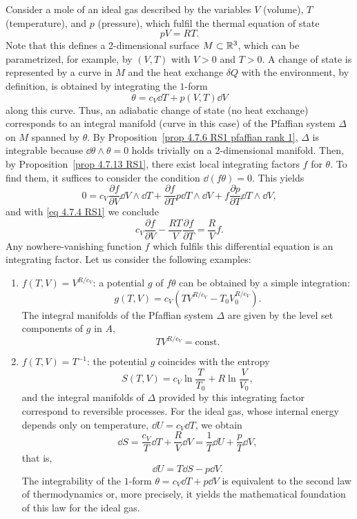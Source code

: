 \begin{example}
    Consider a mole of an ideal gas described by the variables $V$ (volume), $T$ (temperature), and $p$ (pressure), which fulfil the thermal equation of state
    \[pV=RT.\label{eq 4.7.4 RS1}\]
    Note that this defines a 2-dimensional surface $M\subset \mathbb{R}^3$, which can be parametrized, for example, by $(V,T)$ with $V>0$ and $T>0$. A change of state is represented by a curve in $M$ and the heat exchange $\delta Q$ with the environment, by definition, is obtained by integrating the $1$-form
    \[\theta=c_V\dd T+p(V,T)\dd V\]
    along this curve. Thus, an adiabatic change of state (no heat exchange) corresponds to an integral manifold (curve in this case) of the Pfaffian system $\Delta$ on $M$ spanned by $\theta$. By Proposition~\ref{prop 4.7.6 RS1 pfaffian rank 1}, $\Delta$ is integrable because $\dd\theta\wedge\theta=0$ holds trivially on a 2-dimensional manifold. Then, by Proposition~\ref{prop 4.7.13 RS1}, there exist local integrating factors $f$ for $\theta$. To find them, it suffices to consider the condition $\dd(f\theta)=0$. This yields
    \[0=c_V\frac{\partial f}{\partial V}\dd V\wedge \dd T+\frac{\partial f}{\partial T}p\dd T\wedge \dd V+f\frac{\partial p}{\partial T}\dd T\wedge \dd V,\]
    and with \eqref{eq 4.7.4 RS1} we conclude
    \[c_V\frac{\partial f}{\partial V}-\frac{RT}{V}\frac{\partial f}{\partial T}=\frac RV f.\]
    Any nowhere-vanishing function $f$ which fulfils this differential equation is an integrating factor. Let us consider the following examples:
    \begin{enumerate}
        \item $f(T,V)=V^{R/c_V}$: a potential $g$ of $f\theta$ can be obtained by a simple integration:
        \[g(T,V)=c_V\left(TV^{R/c_V}-T_0V_0^{R/c_V}\right).\]
        The integral manifolds of the Pfaffian system $\Delta$ are given by the level set components of $g$ in $A$, 
        \[TV^{R/c_V}=\mathrm{const}.\]
        \item $f(T,V)=T^{-1}$: the potential $g$ coincides with the entropy
        \[S(T,V)=c_V\ln\frac{T}{T_0}+R\ln\frac{V}{V_0},\]
        and the integral manifolds of $\Delta$ provided by this integrating factor correspond to reversible processes. For the ideal gas, whose internal energy depends only on temperature, $\dd U=c_V\dd T$, we obtain
        \[\dd S=\frac{c_V}{T}\dd T+\frac{R}{V}\dd V=\frac{1}{T}\dd U+\frac{p}{T}\dd V,\]
        that is,
        \[\dd U=T\dd S-p \dd V.\]
        The integrability of the $1$-form $\theta=c_V\dd T+p\dd V$ is equivalent to the second law of thermodynamics or, more precisely, it yields the mathematical foundation of this law for the ideal gas.
    \end{enumerate}
\end{example}




